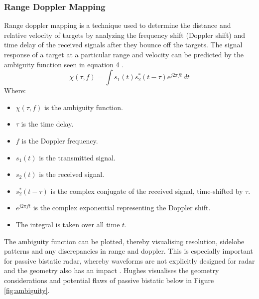 \documentclass[12pt,a4paper]{article}
\begin{document}
\subsubsection{Range Doppler Mapping}
Range doppler mapping is a technique used to determine the distance and relative velocity of targets by analyzing the frequency shift (Doppler shift) and time delay of the received signals after they bounce off the targets. The signal response of a target at a particular range and velocity can be predicted by the ambiguity function seen in equation 4 \cite{INTRO2017}. 
\begin{equation}
    \chi(\tau, f) = \int s_1(t) s_2^*(t - \tau) e^{j2\pi f t} \, dt
\end{equation}
Where:
\begin{multicols}{2}
\begin{itemize}
\item \( \chi(\tau, f) \) is the ambiguity function.
\item \( \tau \) is the time delay.
\item \( f \) is the Doppler frequency.
\item \( s_1(t) \) is the transmitted signal.
\item \( s_2(t) \) is the received signal.
\item \( s_2^*(t - \tau) \) is the complex conjugate of the received signal, time-shifted by \( \tau \).
\item \( e^{j2\pi f t} \) is the complex exponential representing the Doppler shift.
\item The integral is taken over all time \( t \).
\end{itemize}
\end{multicols}
\noindent The ambiguity function can be plotted, thereby visualising resolution, sidelobe patterns and any discrepancies in range and doppler. This is especially important for passive bistatic radar, whereby waveforms are not explicitly designed for radar and the geometry also has an impact \cite{FundamentalsPassiveRadar}. Hughes visualises the geometry considerations and potential flaws of passive bistatic below in Figure \ref{fig:ambiguity}.
\end{document}
